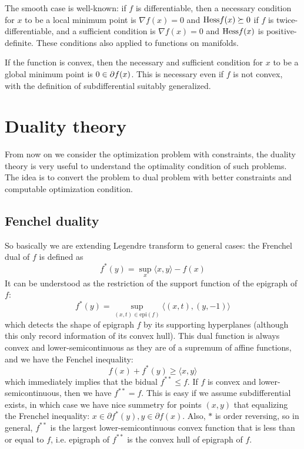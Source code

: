 \documentclass[a4paper]{mynotes}
\begin{document}
The smooth case is well-known: if $f$ is differentiable, then a necessary condition for $x$ to be a local minimum point is $\nabla f(x)=0$ and  $\mathrm{Hess} f(x)\succeq 0$ if $f$ is twice-differentiable, and a sufficient condition is $\nabla f(x)=0$ and $\mathrm{Hess} f(x)$ is positive-definite. These conditions also applied to functions on manifolds.

If the function is convex, then the necessary and sufficient condition for $x$ to be a global minimum point is $0\in \partial f(x)$. This is necessary even if $f$ is not convex, with the definition of subdifferential suitably generalized.

\section{Duality theory}

From now on we consider the optimization problem with constraints, the duality theory is very useful to understand the optimality condition of such problems. The idea is to convert the problem to dual problem with better constraints and computable optimization condition.

\subsection{Fenchel duality}  

So basically we are extending Legendre transform to general cases: the Frenchel dual of $f$ is defined as $$f^*(y)=\sup_x {\langle x,y\rangle -f(x)}$$It can be understood as the restriction of the support function of the epigraph of $f$: $$f^*(y)=\sup_{(x,t)\in \text{epi}(f)} \langle (x,t),(y,-1)\rangle$$which detects the shape of epigraph $f$ by its supporting hyperplanes (although this only record information of its convex hull).
This dual function is always convex and lower-semicontinuous as they are of a supremum of affine functions, and we have the Fenchel inequality: $$f(x)+f^*(y)\geq \langle x,y\rangle$$
which immediately implies that the bidual $f^{**}\le f$. If $f$ is convex and lower-semicontinuous, then we have $f^{**}=f$. This is easy if we assume subdifferential exists, in which case we have nice summetry for points $(x,y)$ that equalizing the  Frenchel inequality: $x\in\partial f^*(y), y\in \partial f(x)$. Also, $*$ is order reversing, so in general, $f^{**}$ is the largest lower-semicontinuous convex function that is less than or equal to $f$, i.e. epigraph of $f^{**}$ is the convex hull of epigraph of $f$. 
\end{document}
